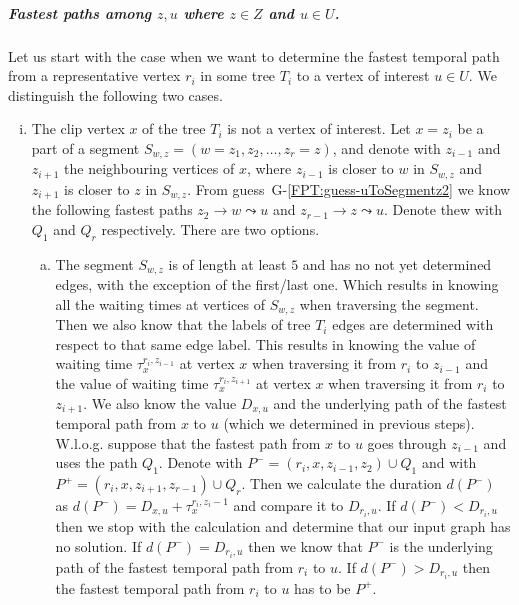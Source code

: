 \documentclass[a4paper,UKenglish,cleveref, autoref, thm-restate]{lipics-v2021}
\begin{document}
\subparagraph{\boldmath Fastest paths among $z,u$ where $z \in Z$ and $u \in U$.}
Let us start with the case when we want to determine the fastest temporal path from a representative vertex $r_i$ in some tree $T_i$ to a vertex of interest $u \in U$.
We distinguish the following two cases.
\begin{enumerate}[(i)]
    \item \label{FPT:z-u-clipnotU}
    The clip vertex $x$ of the tree $T_i$ is not a vertex of interest.
    Let $x = z_i$ be a part of a segment $S_{w,z} = (w = z_1, z_2, \dots, z_r = z)$, and denote with $z_{i-1}$ and $z_{i+1}$ the neighbouring vertices of $x$, 
    where $z_{i-1}$ is closer to $w$ in $S_{w,z}$ and 
    $z_{i+1}$ is closer to $z$ in $S_{w,z}$.
    From guess~G-\ref{FPT:guess-uToSegmentz2} we know the following fastest paths $z_{2} \rightarrow w \leadsto u$ and %
    $z_{r-1} \rightarrow z \leadsto u$.
    Denote thew with $Q_1$ and $Q_r$ respectively.
    There are two options.
    \begin{enumerate}[(a)]
        \item The segment $S_{w,z}$ is of length at least $5$ and has no not yet determined edges, with the exception of the first/last one.
        Which results in knowing all the waiting times at vertices of $S_{w,z}$ when traversing the segment.
        Then we also know that the labels of tree $T_i$ edges are determined with respect to that same edge label.
        This results in knowing the value of waiting time
        $\tau_x^{r_i,z_{i-1}}$ at vertex $x$ when traversing it from $r_i$ to $z_{i-1}$ and 
        the value of waiting time $\tau_x^{r_i,z_{i+1}}$ at vertex $x$
        when traversing it from $r_i$ to $z_{i+1}$.
        We also know the value $D_{x,u}$ and the underlying path of the fastest temporal path from $x$ to $u$ (which we determined in previous steps).
        W.l.o.g. suppose that the fastest path from $x$ to $u$ goes through $z_{i-1}$ and uses the path $Q_1$.
        Denote with $P^{-} = (r_i, x, z_{i-1}, z_2) \cup Q_1$
        and with $P^{+} = (r_i, x, z_{i+1}, z_{r-1}) \cup Q_r$.
        Then we calculate the duration $d(P^{-})$ as $d(P^{-}) = D_{x,u} + \tau_x^{r_i,z_i-1}$
        and compare it to $D_{r_i,u}$.
        If $d(P^{-}) < D_{r_i,u} $ then we stop with the calculation and determine that our input graph has no solution.
        If $d(P^{-}) = D_{r_i,u} $ then we know that $P^{-}$ is the underlying path of the fastest temporal path from $r_i$ to $u$. 
        If $d(P^{-}) > D_{r_i,u} $ then the fastest temporal path from $r_i$ to $u$ has to be $P^{+}$.

\end{enumerate}
\end{enumerate}
\end{document}
